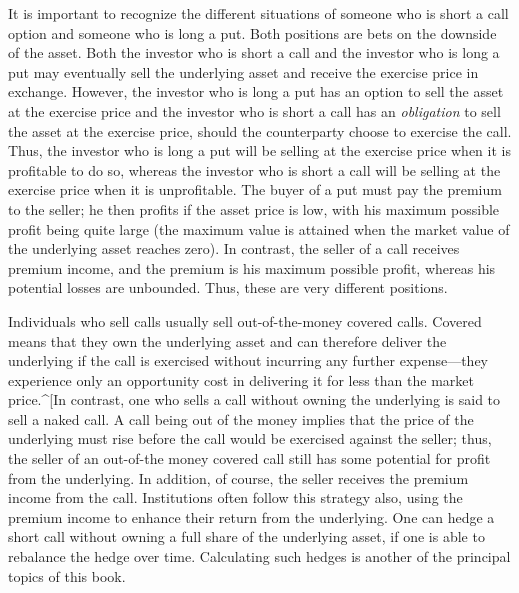 It is important to recognize the different situations of someone who is short a call option and someone who is long a put.  Both positions are bets on the downside of the asset.  Both the investor who is short a call and the investor who is long a put may eventually sell the underlying asset  and receive the exercise price in exchange.  However, the investor who is long a put has an option to sell the asset at the exercise price and the investor who is short a call has an \emph{obligation} to sell the asset at the exercise price, should the counterparty choose to exercise the call.  Thus, the investor who is long a put will be selling at the exercise price when it is profitable to do so, whereas the investor who is short a call will be selling at the exercise price when it is unprofitable.  The buyer of a put must pay the premium to the seller; he then profits if the asset price is low, with his maximum possible profit being quite large (the maximum value is attained when the market value of the underlying asset reaches zero).  In contrast, the seller of a call receives premium income, and the premium is his maximum possible profit, whereas his potential losses are unbounded.  Thus, these are very different positions.

Individuals who sell calls usually sell out-of-the-money covered calls.  Covered  means that they own the underlying asset and can therefore deliver the underlying if the call is exercised without incurring any further expense---they experience only an opportunity cost in delivering it for less than the market price.^[In contrast, one who sells a call without owning the underlying is said to sell a naked call.  \index{naked call] The seller of a naked call, or the seller of a put, must post margin, just like a short seller of stocks, in order to ensure that he can meet his obligation.  However, this does not apply to sellers of covered calls.}  A  call being out of the money implies that the price of the underlying must rise before the call would be exercised against the seller; thus, the seller of an out-of-the money covered call still has some potential for profit from the underlying.  In addition, of course, the seller receives the premium income from the call.  Institutions often follow this strategy also, using the premium income to enhance their return from the underlying.     One can hedge a short call without owning a full share of the underlying asset, if one is able to rebalance the hedge over time.  Calculating such hedges is another of the principal topics of this book.

